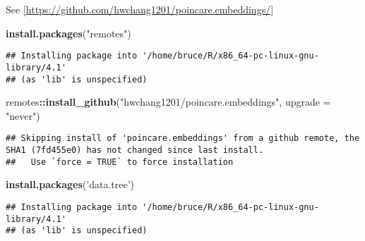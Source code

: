 \documentclass[
  11pt,
]{book}
\newenvironment{Shaded}{\begin{snugshade}}{\end{snugshade}}
\newcommand{\DataTypeTok}[1]{\textcolor[rgb]{0.13,0.29,0.53}{#1}}
\newcommand{\KeywordTok}[1]{\textcolor[rgb]{0.13,0.29,0.53}{\textbf{#1}}}
\newcommand{\NormalTok}[1]{#1}
\newcommand{\OperatorTok}[1]{\textcolor[rgb]{0.81,0.36,0.00}{\textbf{#1}}}
\newcommand{\StringTok}[1]{\textcolor[rgb]{0.31,0.60,0.02}{#1}}
\begin{document}
See {[}\url{https://github.com/hwchang1201/poincare.embeddings/}{]}

\citep{DBLP:journals/corr/NickelK17}

\citep{DBLP:journals/corr/abs-1806-03417}

\begin{Shaded}
\begin{Highlighting}[]
\KeywordTok{install.packages}\NormalTok{(}\StringTok{"remotes"}\NormalTok{)}
\end{Highlighting}
\end{Shaded}

\begin{verbatim}
## Installing package into '/home/bruce/R/x86_64-pc-linux-gnu-library/4.1'
## (as 'lib' is unspecified)
\end{verbatim}

\begin{Shaded}
\begin{Highlighting}[]
\NormalTok{remotes}\OperatorTok{::}\KeywordTok{install_github}\NormalTok{(}\StringTok{"hwchang1201/poincare.embeddings"}\NormalTok{, }\DataTypeTok{upgrade =} \StringTok{"never"}\NormalTok{)}
\end{Highlighting}
\end{Shaded}

\begin{verbatim}
## Skipping install of 'poincare.embeddings' from a github remote, the SHA1 (7fd455e0) has not changed since last install.
##   Use `force = TRUE` to force installation
\end{verbatim}

\begin{Shaded}
\begin{Highlighting}[]
\KeywordTok{install.packages}\NormalTok{(}\StringTok{'data.tree'}\NormalTok{)}
\end{Highlighting}
\end{Shaded}

\begin{verbatim}
## Installing package into '/home/bruce/R/x86_64-pc-linux-gnu-library/4.1'
## (as 'lib' is unspecified)
\end{verbatim}
\end{document}
